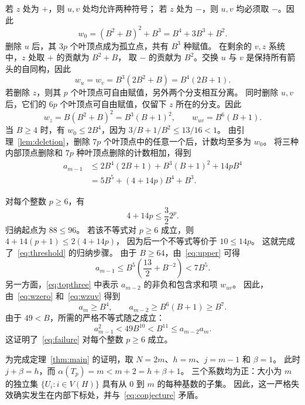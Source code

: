 \documentclass[UTF8,11pt,a4paper,fontset=fandol]{ctexart}
\theoremstyle{remark}
\numberwithin{equation}{section}
\begin{document}
若 $z$ 处为 $+$，则 $u,v$ 处均允许两种符号；
若 $z$ 处为 $-$，则 $u,v$ 均必须取 $-$。因此
\begin{equation}
 w_0=(B^2+B)^2+B^3=B^4+3B^3+B^2.
 \label{eq:wzero}
\end{equation}
删除 $u$ 后，其 $3p$ 个叶顶点成为孤立点，共有 $B^3$ 种赋值。
在剩余的 $v,z$ 系统中，$z$ 处取 $+$ 的贡献为 $B^2+B$，
取 $-$ 的贡献为 $B^2$。交换 $u$ 与 $v$ 是保持所有箭头的自同构，因此
\begin{equation}
 w_u=w_v=B^3(2B^2+B)=B^4(2B+1).
 \label{eq:wu}
\end{equation}
若删除 $z$，则其 $p$ 个叶顶点可自由赋值，另外两个分支相互分离。
同时删除 $u,v$ 后，它们的 $6p$ 个叶顶点可自由赋值，仅留下 $z$ 所在的分支。因此
\begin{equation}
 w_z=B(B^2+B)^2=B^3(B+1)^2,\qquad
 w_{uv}=B^6(B+1).
 \label{eq:wzuv}
\end{equation}
当 $B\geq4$ 时，有 $w_0\leq2B^4$，因为 $3/B+1/B^2\leq13/16<1$。
由引理~\ref{lem:deletion}，删除 $7p$ 个叶顶点中的任意一个后，计数均至多为 $w_0$。
将三种内部顶点删除和 $7p$ 种叶顶点删除的计数相加，得到
\begin{equation}
\begin{aligned}
 a_{m-1}
 &\leq 2B^4(2B+1)+B^3(B+1)^2+14pB^4\\
 &=5B^5+(4+14p)B^4+B^3.
\end{aligned}
\label{eq:upper}
\end{equation}

对每个整数 $p\geq6$，有
\begin{equation}
 4+14p\leq \frac{3}{2}2^p.
 \label{eq:threshold}
\end{equation}
归纳起点为 $88\leq96$。
若该不等式对 $p\geq6$ 成立，则 $4+14(p+1)\leq2(4+14p)$，
因为后一个不等式等价于 $10\leq14p$。
这就完成了~\eqref{eq:threshold} 的归纳步骤。
由于 $B\geq64$，由~\eqref{eq:upper} 可得
\begin{equation}
 a_{m-1}\leq B^5\left(\frac{13}{2}+B^{-2}\right)<7B^5.
 \label{eq:upperfinal}
\end{equation}
另一方面，\eqref{eq:topthree} 中表示 $a_{m-2}$ 的非负和包含求和项 $w_{uv}$。
因此，由~\eqref{eq:wzero} 和~\eqref{eq:wzuv} 得到
\begin{equation}
 a_m\geq B^4,\qquad
 a_{m-2}\geq B^6(B+1)\geq B^7.
 \label{eq:lower}
\end{equation}
由于 $49<B$，所需的严格不等式随之成立：
\[
 a_{m-1}^{2}<49B^{10}<B^{11}\leq a_{m-2}a_m.
\]
这证明了~\eqref{eq:failure} 对每个整数 $p\geq6$ 成立。

为完成定理~\ref{thm:main} 的证明，取 $N=2m$、$h=m$、$j=m-1$ 和 $\beta=1$。
此时 $j+\beta=h$，而 $\alpha(T_p)=m<m+2=h+\beta+1$。
三个系数均为正：大小为 $m$ 的独立集 $\{U_i:i\in V(H)\}$
具有从 $0$ 到 $m$ 的每种基数的子集。
因此，这一严格失效确实发生在内部下标处，并与~\eqref{eq:conjecture} 矛盾。
\end{document}
